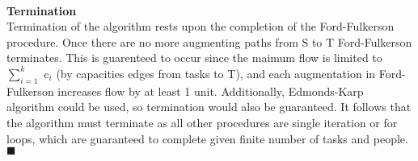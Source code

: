 \documentclass[10pt]{csc_assignment}
\begin{document}
\begin{description}
\\
\textbf{Termination}\\
Termination of the algorithm rests upon the completion of the Ford-Fulkerson procedure. Once there are no more augmenting paths from S to T  Ford-Fulkerson terminates. This is guarenteed to occur since the maimum flow is limited to $\sum_{i = 1}^{k}$ c$_{i}$ (by capacities edges from tasks to T), and each augmentation in Ford-Fulkerson increases flow by at least 1 unit. Additionally, Edmonds-Karp algorithm could be used, so termination would also be guaranteed. It follows that the algorithm must terminate as all other procedures are single iteration or for loops, which are guaranteed to complete given finite number of tasks and people.\\
$\blacksquare$\\    



\end{description}
\end{document}
